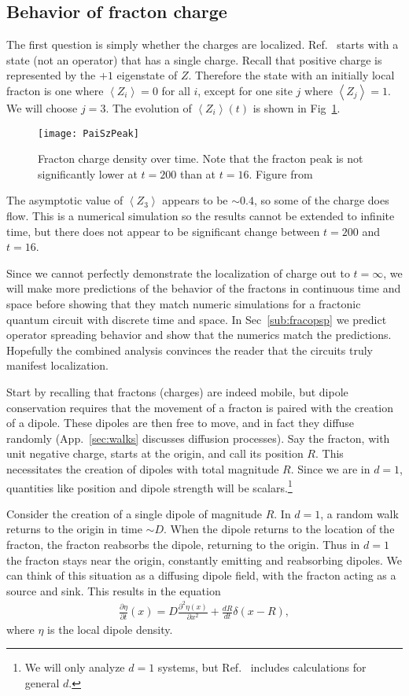 \documentclass[a4paper,11pt]{article}
\newcommand{\pd}[2]{\frac{\partial #1}{\partial #2}}
\newcommand{\pdn}[3]{\frac{\partial^{#3} #1}{\partial #2^{#3}}}
\newcommand{\nd}[2]{\frac{d #1}{d #2}}
\newcommand{\ex}[1]{\left\langle #1 \right\rangle}
\begin{document}
\subsection{Behavior of fracton charge} \label{sub:fraccharge}

The first question is simply whether the charges are localized. Ref.~\cite{PaiFracton} starts with a state (not an operator) that has a single charge. 
Recall that positive charge is represented by the $+1$ eigenstate of $Z$. Therefore the state with an initially local fracton is one where $\ex{Z_i}=0$ for all $i$, except for one site $j$ where $\ex{Z_j}=1$. We will choose $j=3$.
The evolution of $\ex{Z_i}(t)$ is shown in Fig~\ref{fig:PaiSzPeak}.
\begin{figure}
	\centering
	\texttt{[image: PaiSzPeak]}
	\caption{Fracton charge density over time. Note that the fracton peak is not significantly lower at $t=200$ than at $t=16$. Figure from~\cite{PaiFracton}}
	\label{fig:PaiSzPeak}
\end{figure}
The asymptotic value of $\ex{Z_3}$ appears to be $\sim0.4$, so some of the charge does flow. This is a numerical simulation so the results cannot be extended to infinite time, but there does not appear to be significant change between $t=200$ and $t=16$.

Since we cannot perfectly demonstrate the localization of charge out to $t=\infty$, we will make more predictions of the behavior of the fractons in continuous time and space before showing that they match numeric simulations for a fractonic quantum circuit with discrete time and space. In Sec~\ref{sub:fracopsp} we predict operator spreading behavior and show that the numerics match the predictions. Hopefully the combined analysis convinces the reader that the circuits truly manifest localization.

Start by recalling that fractons (charges) are indeed mobile, but dipole conservation requires that the movement of a fracton is paired with the creation of a dipole. These dipoles are then free to move, and in fact they diffuse randomly (App.~\ref{sec:walks} discusses diffusion processes). Say the fracton, with unit negative charge, starts at the origin, and call its position $R$. This necessitates the creation of dipoles with total magnitude $R$. Since we are in $d=1$, quantities like position and dipole strength will be scalars.\footnote{We will only analyze $d=1$ systems, but Ref.~\cite{PaiFracton} includes calculations for general $d$.}

Consider the creation of a single dipole of magnitude $R$. In $d=1$, a random walk returns to the origin in time $\sim D$.  When the dipole returns to the location of the fracton, the fracton reabsorbs the dipole, returning to the origin. Thus in $d=1$ the fracton stays near the origin, constantly emitting and reabsorbing dipoles. We can think of this situation as a diffusing dipole field, with the fracton acting as a source and sink. This results in the equation
\begin{align}
\pd{\eta}{t}(x) = D\pdn{\eta(x)}{x}{2} + \nd{R}{t}\delta(x-R),
\end{align}
where $\eta$ is the local dipole density.
\end{document}

